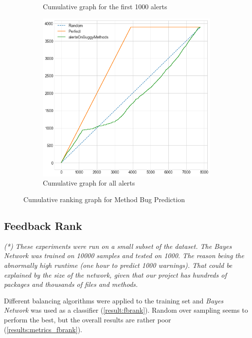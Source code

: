 \begin{figure}[H]
\begin{subfigure}{.5\textwidth}
		\caption{Cumulative graph for the first 1000 alerts}\label{}
	\end{subfigure}%
	\begin{subfigure}{.5\textwidth}
		\centering
		\includegraphics[scale=0.3]{./src/methodBug/methodbug_cumulative_graph_all.png}
		\caption{Cumulative graph for all alerts}\label{}
	\end{subfigure}
	\caption{Cumulative ranking graph for Method Bug Prediction}
	\label{results:cumulative_bugprediction}
\end{figure}

\subsection{Feedback Rank}

\textit{(*) These experiments were run on a small subset of the dataset. The Bayes Network was trained on 10000 samples and tested on 1000. The reason being the abnormally high runtime (one hour to predict 1000 warnings). That could be explained by the size of the network, given that our project has hundreds of packages and thousands of files and methods.}

Different balancing algorithms were applied to the training set and \textit{Bayes Network} was used as a classifier (\cref{result:fbrank}). Random over sampling seems to perform the best, but the overall results are rather poor (\cref{results:metrics_fbrank}).

